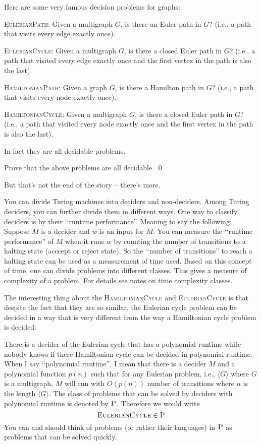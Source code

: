 Here are some very famous decision problems for graphs:
\begin{tightlist}
  \item \textsc{EulerianPath}: Given a multigraph $G$, is there an Euler path in $G$?
  (i.e., a path that visits every edge exactly once).
  \item \textsc{EulerianCycle}: Given a multigraph $G$, is there a closed Euler path in $G$?
  (i.e., a path that visited every edge exactly once and the first vertex in the path
  is also the last).
  \item \textsc{HamiltonianPath}: Given a graph $G$, is there a
  Hamilton path in $G$?
  (i.e., a path that visits every node exactly once).
  \item \textsc{HamiltonianCycle}: Given a multigraph $G$, is there a closed Euler path in $G$?
  (i.e., a path that visited every node exactly once and the first vertex in the path
  is also the last).
\end{tightlist}
In fact they are all decidable problems.

\begin{ex}
  Prove that the above problems are all decidable.
  \qed
\end{ex}

But that's not the end of the story -- there's more.

You can divide Turing machines into deciders and non-deciders.
Among Turing deciders, you can further divide them in different ways.
One way to classify deciders is by their \lq\lq runtime performance''.
Meaning to say the following:
Suppose $M$ is a decider and $w$ is an input for $M$.
You can measure the \lq\lq runtime performance'' of $M$ when it runs $w$ by
counting the number of transitions to a halting state (acccept or reject state).
So the \lq\lq number of transitions'' to reach a halting state can be used as a
measurement of time used.
Based on this concept of time, one can divide problems into different
classes.
This gives a measure of complexity of a problem.
For details see notes on time complexity classes.

The interesting thing about the
\textsc{HamiltonianCycle}
and
\textsc{EulerianCycle}
is that despite the fact that they are so similar,
the Eulerian cycle problem can be decided in a way that
is very different from the way a Hamiltonian cycle problem is decided:

There is a decider of the Eulerian cycle that has a polynomial
runtime while nobody knows if there Hamiltonian cycle can be
decided in polynomial runtime.
When I say \lq\lq polynomial runtime'', I mean
that there is a decider $M$ and a polynomial function $p(n)$
such that for any Eulerian problem, i.e., $\langle G \rangle$ where $G$ is a multigraph,
$M$ will run with $O(p(n))$ number of transitions
where $n$ is the length $\langle G \rangle$.
The class of problems that can be solved by deciders with polynomial runtime
is denoted by $\textsc{P}$.
Therefore we would write
\[
\textsc{EulerianCycle} \in \textsc{P}
\]
You can and should think of problems
(or rather their languages) in $\textsc{P}$ as
problems that can be solved
quickly.

